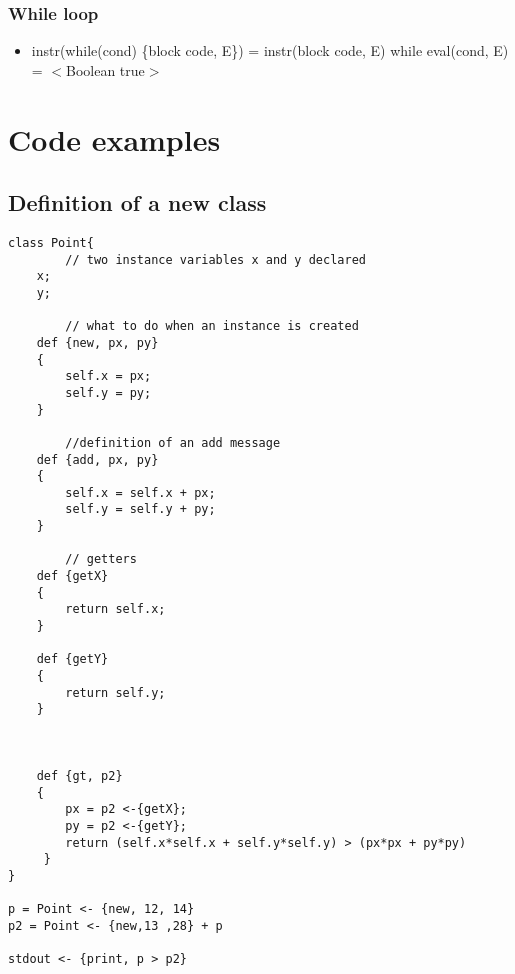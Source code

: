\documentclass{eplDoc}
\begin{document}
\subsubsection{While loop}

\begin{itemize}
	\item instr(while(cond) \{block code, E\}) = instr(block code, E) while eval(cond, E) = $<$Boolean true$>$
     
                       
\end{itemize}

\section{Code examples}

\subsection{Definition of a new class}
\begin{lstlisting}
class Point{
		// two instance variables x and y declared
    x;
    y;

		// what to do when an instance is created
    def {new, px, py}
    {
        self.x = px;
        self.y = py;
    }
		
		//definition of an add message
    def {add, px, py}
    {
        self.x = self.x + px;
        self.y = self.y + py;
    }

		// getters
    def {getX}
    {
        return self.x;    
    }
    
    def {getY}
    {
        return self.y;    
    }
		
		
		
    def {gt, p2}
    {
        px = p2 <-{getX};    
        py = p2 <-{getY};    
        return (self.x*self.x + self.y*self.y) > (px*px + py*py)
     }
}

p = Point <- {new, 12, 14}
p2 = Point <- {new,13 ,28} + p

stdout <- {print, p > p2}

\end{lstlisting}
\end{document}
